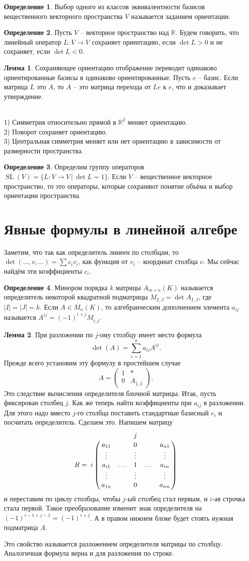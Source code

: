 \documentclass[10pt,a4paper,oneside]{book} %
\theoremstyle{definition}
\newtheorem*{defn}{Определение}
\newtheorem{lem}{Лемма}
\newcommand{\mb}[1]{\mathbb{#1}}
\newcommand{\ovl}{\overline}
\newcommand{\SL}{\operatorname{SL}}
\def\exm{\noindent {\bf Примеры:}}
\def\dfn{\begin{defn}}
\def\edfn{\end{defn}}
\def\lm{\begin{lem}}
\def\elm{\end{lem}}
\def\pmat{\begin{pmatrix}}
\def\epmat{\end{pmatrix}}
\begin{document}
\dfn Выбор одного из классов эквивалентности базисов вещественного векторного пространства $V$ называется заданием ориентации.
\edfn

\dfn Пусть $V$ -- векторное пространство над $\mb R$. Будем говорить, что линейный оператор $L\colon V \to V$ сохраняет ориентацию, если $\det L>0$ и не сохраняет, если $\det L<0$.
\edfn

\lm Сохраняющее ориентацию отображение переводит одинаково ориентированные базисы в одинаково ориентированные.
\proof Пусть $e$ -- базис. Если матрица $L$ это $A$, то $A$ -- это матрица перехода от $Le$ к $e$, что и доказывает утверждение.
\endproof
\elm

\exm\\
1) Симметрия относительно прямой в $\mb R^2$ меняет ориентацию.\\
2) Поворот сохраняет ориентацию.\\
3) Центральная симметрия меняет или нет ориентацию в зависимости от размерности пространства.


\dfn Определим группу операторов $\SL(V)=\{ L\colon V \to V \,|\, \det L=1\}$. Если $V$ -- вещественное векторное пространство, то это операторы, которые сохраняют понятие объёма и  выбор ориентации пространства.
\edfn



\section{Явные формулы в линейной алгебре}

Заметим, что так как определитель линеен по столбцам, то $\det (\dots,v,\dots)= \sum c_i v_i$, как функция от $v_i$ -- координат  столбца $v$. Мы сейчас найдём эти коэффициенты $c_i$.

\dfn Минором порядка $k$ матрицы $A_{m\times n}(K)$ называется определитель некоторой квадратной подматрицы $M_{I,J}=\det A_{I,J}$, где $|I|=|J|=k$. Если $A\in M_n(K)$, то алгебраическим дополнением элемента $a_{ij}$ называется $A^{ij}=(-1)^{i+j} M_{\ovl{i},\ovl{j}}$.
\edfn



\lm При разложении по $j$-ому столбцу имеет место формула  $$\det(A)=\sum_{i=1}^n a_{ij} A^{ij}.$$
\proof Прежде всего установим эту формулу в простейшем случае $$A=\pmat 1& *\\
0& A_{\ovl{1},\ovl{1}}\epmat. $$
Это следствие вычисления определителя блочной матрицы. Итак, пусть фиксирован столбец $j$. Как же теперь найти коэффициенты при $a_{ij}$ в разложении. Для этого надо вместо $j$-го столбца поставить стандартные базисный $e_i$ и посчитать определитель. Сделаем это. Напишем матрицу
$$B= \bordermatrix{
 & &       &  j &      & \cr
 & a_{11} && 0 &  & a_{n1}    \cr
 & \vdots& & \vdots& & \vdots\cr
 i &a_{i1}&\dots & 1 &\dots & a_{in} \cr
 & \vdots& & \vdots& & \vdots\cr
 & a_{1n} &  & 0 &      &a_{nn} } $$
и переставим по циклу столбцы, чтобы $j$-ый столбец стал первым, и $i$-ая строчка стала первой. Такое преобразование изменит знак определителя на $(-1)^{i-1+j-1}=(-1)^{i+j}$. А в правом нижнем блоке будет стоять нужная подматрица $A$.
\endproof
\elm
Это свойство называется разложением  определителя матрицы  по столбцу. Аналогичная формула верна и для разложения по строке.
\end{document}
